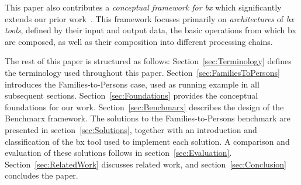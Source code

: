 This paper also contributes a \emph{conceptual framework for bx} which significantly extends our prior work~\cite{Anjorin2017}. 
This framework focuses primarily on \emph{architectures} of \emph{bx tools}, defined by their input and output data, the basic operations from which bx are composed, as well as their composition into different processing chains.  

The rest of this paper is structured as follows: Section~\ref{sec:Terminology} defines the terminology used throughout this paper. Section~\ref{sec:FamiliesToPersons} introduces the Families-to-Persons case, used as running example in all subsequent sections. 
Section~\ref{sec:Foundations} provides the conceptual foundations for our work. 
Section~\ref{sec:Benchmarx} describes the design of the Benchmarx framework. 
The solutions to the Families-to-Persons benchmark are presented in section~\ref{sec:Solutions}, together with an introduction and classification of the bx tool used to implement each solution. 
A comparison and evaluation of these solutions follows in section~\ref{sec:Evaluation}. 
Section~\ref{sec:RelatedWork} discusses related work, and section~\ref{sec:Conclusion} concludes the paper.
